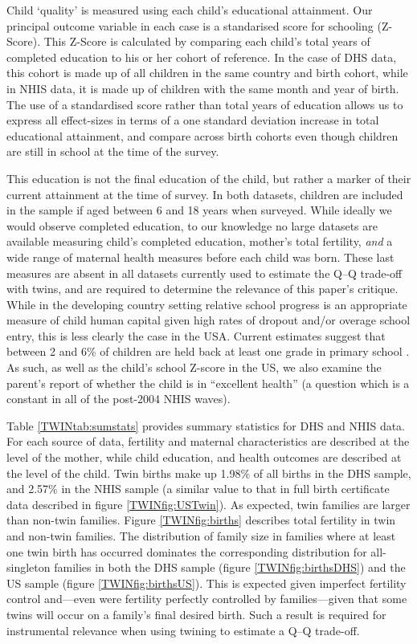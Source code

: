\documentclass[subeqn]{article}
\begin{document}
\begin{spacing}{1.4}
Child `quality' is measured using each child's educational attainment. Our 
principal outcome variable in each case is a standarised score for schooling 
(Z-Score). This Z-Score is calculated by comparing each child's total years of 
completed education to his or her cohort of reference.  In the case of DHS data,
this cohort is made up of all children in the same country and birth cohort, 
while in NHIS data, it is made up of children with the same month and year of 
birth. The use of a standardised score rather than total years of education
allows us to express all effect-sizes in terms of a one standard deviation
increase in total educational attainment, and compare across birth cohorts
even though children are still in school at the time of the survey.

This education is not the final education of the child, but rather a marker of
their current attainment at the time of survey.  In both datasets, children are
included in the sample if aged between 6 and 18 years when surveyed.  While
ideally we would observe completed education, to our knowledge no large datasets
are available measuring child's completed education, mother's total fertility,
\emph{and} a wide range of maternal health measures before each child was born.
These last measures are absent in all datasets currently used to estimate the
Q--Q trade-off with twins, and are required to determine the relevance of this
paper's critique.  While in the developing country setting relative school
progress is an appropriate measure of child human capital given high rates of
dropout and/or overage school entry, this is less clearly the case in the USA.
Current estimates suggest that between 2 and 6\% of children are held back at
least one grade in primary school \citep{Warrenetal2014}.  As such, as well
as the child's school Z-score in the US, we also examine the parent's report of
whether the child is in ``excellent health'' (a question which is a constant in
all of the post-2004 NHIS waves).

Table \ref{TWINtab:sumstats} provides summary statistics for DHS and NHIS data.
For each source of data, fertility and maternal characteristics are described at
the level of the mother, while child education, and health outcomes are
described at the level of the child.  Twin births make up 1.98\% of all births
in the DHS sample, and 2.57\% in the NHIS sample (a similar value to that in full
birth certificate data described in  figure \ref{TWINfig:USTwin}).  As expected,
twin families are larger than non-twin families. Figure \ref{TWINfig:births}
describes total fertility in twin and non-twin families. The distribution of
family size in families where at least one twin birth has occurred dominates the
corresponding distribution for all-singleton families in both the DHS sample
(figure \ref{TWINfig:birthsDHS}) and the US sample (figure \ref{TWINfig:birthsUS}).
This is expected given imperfect fertility control and---even were fertility
perfectly controlled by families---given that some twins will occur on a family's
final desired birth.  Such a result is required for instrumental relevance when
using twining to estimate a Q--Q trade-off.


\end{spacing}
\end{document}
